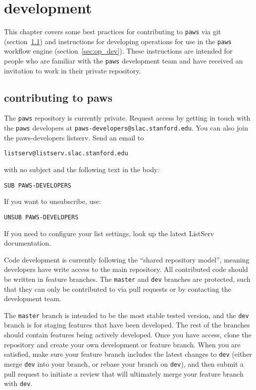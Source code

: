 \chapter{development}
\label{ch:dev}

This chapter covers some best practices 
for contributing to \verb|paws| via git (section~\ref{sec:paws_dev})
and instructions for developing operations
for use in the \verb|paws| workflow engine (section~\ref{sec:op_dev}).
These instructions are intended for people
who are familiar with the \verb|paws| development team
and have received an invitation to work in their private repository.


\section{contributing to paws}
\label{sec:paws_dev}

The \verb|paws| repository is currently private.
Request access by getting in touch with the \verb|paws| developers
at \verb|paws-developers@slac.stanford.edu|. 
You can also join the paws-developers listserv.
Send an email to 
\begin{lstlisting}
listserv@listserv.slac.stanford.edu
\end{lstlisting}
with no subject and the following text in the body: 
\begin{lstlisting}
SUB PAWS-DEVELOPERS
\end{lstlisting}
If you want to unsubscribe, use:
\begin{lstlisting}
UNSUB PAWS-DEVELOPERS
\end{lstlisting}
If you need to configure your list settings, 
look up the latest ListServ documentation.

Code development is currently following the ``shared repository model'',
meaning developers have write access to the main repository.
All contributed code should be written in feature branches.
The \verb|master| and \verb|dev| branches are protected,
such that they can only be contributed to via pull requests
or by contacting the development team.

The \verb|master| branch is intended to be the most stable tested version,
and the \verb|dev| branch is for staging features that have been developed.
The rest of the branches should contain features being actively developed.
Once you have access, clone the repository
and create your own development or feature branch.
When you are satisfied, make sure your feature branch 
includes the latest changes to \verb|dev|
(either merge \verb|dev| into your branch, 
or rebase your branch on \verb|dev|),
and then submit a pull request to initiate 
a review that will ultimately merge your feature branch with \verb|dev|.


